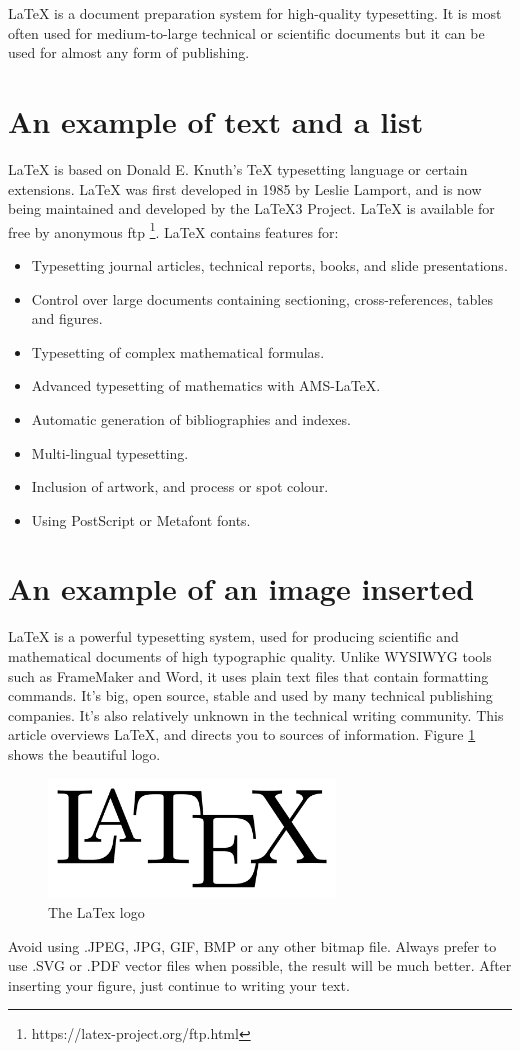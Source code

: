 LaTeX is a document preparation system for high-quality typesetting. It is most often used for medium-to-large technical or scientific documents but it can be used for almost any form of publishing.

\section{An example of text and a list}

LaTeX is based on Donald E. Knuth's TeX typesetting language or certain extensions. LaTeX was first developed in 1985 by Leslie Lamport, and is now being maintained and developed by the LaTeX3 Project. LaTeX is available for free by anonymous ftp \footnote{https://latex-project.org/ftp.html}. LaTeX contains features for:

\begin{itemize}
\item Typesetting journal articles, technical reports, books, and slide presentations.
\item Control over large documents containing sectioning, cross-references, tables and figures.
\item Typesetting of complex mathematical formulas.
\item Advanced typesetting of mathematics with AMS-LaTeX.
\item Automatic generation of bibliographies and indexes.
\item Multi-lingual typesetting.
\item Inclusion of artwork, and process or spot colour.
\item Using PostScript or Metafont fonts.
\end{itemize}

\section{An example of an image inserted}
LaTeX is a powerful typesetting system, used for producing scientific and mathematical documents of high typographic quality. Unlike WYSIWYG tools such as FrameMaker and Word, it uses plain text files that contain formatting
commands. It's big, open source, stable and used by many technical publishing companies. It's also relatively unknown in the technical writing community. This article overviews LaTeX, and directs you to sources of information. Figure \ref{figure:latex-logo} shows the beautiful  logo.

\begin{figure}[htbp]
\begin{center}
\includegraphics[width=3in]{images/LaTeX_logo}
\caption{The LaTex logo}
\label{figure:latex-logo}
\end{center}
\end{figure}

Avoid using .JPEG, JPG, GIF, BMP or any other bitmap file. Always prefer to use .SVG or .PDF vector files when possible, the result will be much better. After inserting your figure, just continue to writing your text.